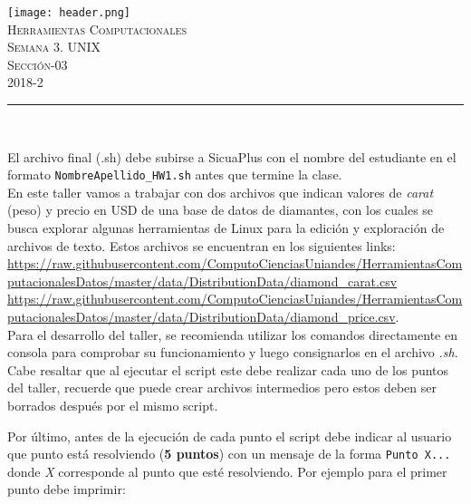 \documentclass[letterpaper,10pt,onecolumn]{exam}
\begin{document}
\begin{center}

\texttt{[image: header.png]}\\[0.5cm]

\textsc{\huge Herramientas Computacionales}\\[0.1cm]

\Large \textsc{Semana 3. UNIX}\\
\Large \textsc{Sección-03}\\
\Large \textsc{2018-2}\\[0.7cm]

\end{center}


\noindent\rule{\textwidth}{1pt}\\[-0.1cm]

\addtocounter{mysection}{1}

El archivo final (.sh) debe subirse a SicuaPlus con el nombre del estudiante en el formato \verb|NombreApellido_HW1.sh| antes que termine la clase.\\


En este taller vamos a trabajar con dos archivos que indican valores de \textit{carat} (peso) y precio en USD de una base de datos de diamantes, con los cuales se busca explorar algunas herramientas de Linux para la edición y exploración de archivos de texto. Estos archivos se encuentran en los siguientes links:\\ \url{https://raw.githubusercontent.com/ComputoCienciasUniandes/HerramientasComputacionalesDatos/master/data/DistributionData/diamond_carat.csv}\\ \url{https://raw.githubusercontent.com/ComputoCienciasUniandes/HerramientasComputacionalesDatos/master/data/DistributionData/diamond_price.csv}.\\

Para el desarrollo del taller, se recomienda utilizar los comandos directamente en consola para comprobar su funcionamiento y luego consignarlos en el archivo \textit{.sh}. Cabe resaltar que al ejecutar el script este debe realizar cada uno de los puntos del taller, recuerde que puede crear archivos intermedios pero estos deben ser borrados después por el mismo script.

Por último, antes de la ejecución de cada punto el script debe indicar al usuario que punto está resolviendo (\textbf{5 puntos}) con un mensaje de la forma \verb|Punto X...| donde \textit{X} corresponde al punto que esté resolviendo. Por ejemplo para el primer punto debe imprimir:
\end{document}
